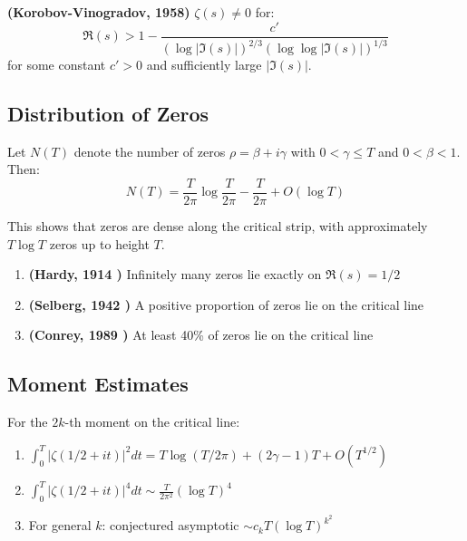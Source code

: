 \begin{theorem}
\label{thm:improved_zerofree}
\textbf{(Korobov-Vinogradov, 1958)} $\zeta(s) \neq 0$ for:
\begin{equation}
\Re(s) > 1 - \frac{c'}{(\log |\Im(s)|)^{2/3}(\log \log |\Im(s)|)^{1/3}}
\end{equation}
for some constant $c' > 0$ and sufficiently large $|\Im(s)|$.
\end{theorem}

\subsection{Distribution of Zeros}

\begin{theorem}
\label{thm:riemann_vonmangoldt}
Let $N(T)$ denote the number of zeros $\rho = \beta + i\gamma$ with $0 < \gamma \leq T$ and $0 < \beta < 1$. Then:
\begin{equation}
N(T) = \frac{T}{2\pi} \log \frac{T}{2\pi} - \frac{T}{2\pi} + O(\log T)
\end{equation}
\end{theorem}

This shows that zeros are dense along the critical strip, with approximately $T \log T$ zeros up to height $T$.

\begin{theorem}
\label{thm:zeros_critical_line}
\begin{enumerate}[label=(\alph*)]
\item \textbf{(Hardy, 1914 \cite{hardy1914})} Infinitely many zeros lie exactly on $\Re(s) = 1/2$
\item \textbf{(Selberg, 1942 \cite{selberg1942})} A positive proportion of zeros lie on the critical line
\item \textbf{(Conrey, 1989 \cite{conrey1989})} At least 40\% of zeros lie on the critical line
\end{enumerate}
\end{theorem}

\subsection{Moment Estimates}

\begin{theorem}
\label{thm:moments_critical}
For the $2k$-th moment on the critical line:
\begin{enumerate}[label=(\alph*)]
\item $\int_0^T |\zeta(1/2 + it)|^2 dt = T \log(T/2\pi) + (2\gamma - 1)T + O(T^{1/2})$
\item $\int_0^T |\zeta(1/2 + it)|^4 dt \sim \frac{T}{2\pi^2} (\log T)^4$ \cite{titchmarsh1986}
\item For general $k$: conjectured asymptotic $\sim c_k T(\log T)^{k^2}$
\end{enumerate}
\end{theorem}

